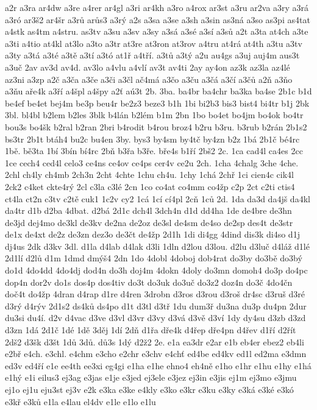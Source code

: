 {a2r
a3ra
ar4dw
a3re
a4rer
ar4gl
a3ri
ar4kh
a3ro
a4rox
ar3st
a3ru
ar2va
a3ry
a3rá
a3ró
ar3š2
ar4šr
a3rů
arůs3
a3rý
a2s
a3sa
a3se
a3sh
a3sin
as3ná
a3so
as3pi
as4tat
a4stk
as4tm
a4stru.
as3tv
a3su
a3sv
a3sy
a3sá
a3sé
a3sí
a3sů
a2t
a3ta
at4ch
a3te
a3ti
a4tio
at4kl
at3lo
a3to
a3tr
at3re
at3ron
at3rov
a4tru
at4rá
at4th
a3tu
a3tv
a3ty
a3tá
a3té
a3tě
a3tí
a3tó
at1ř
a4tří.
a3tů
a3tý
a2u
au4gs
a3uj
auj4m
aus3t
a3uč
2av
av3d
av4d.
av3lo
a4vlu
a4vlí
av3t
av4ti
2ay
ay4on
az3k
az3la
az4lé
az3ni
a3zp
a2č
a3ča
a3če
a3či
a3čl
ač4má
a3čo
a3ču
a3čá
a3čí
a3čů
a2ň
a3ňo
a3ňu
aře4k
a3ří
a4špl
a4špy
a2ť
aú3t
2b.
3ba.
ba4br
ba4chr
ba3ka
ba4se
2b1c
b1d
be4ef
be4et
bej4m
be3p
beu4r
be2z3
beze3
b1h
1bi
bi2b3
bis3
bist4
bi4tr
b1j
2bk
3bl.
bl4bl
b2lem
b2les
3blk
b4lán
b2lém
b1m
2bn
1bo
bo4et
bo4jm
bo4ok
bo4tr
bou3s
bo4šk
b2ral
b2ran
2bri
b4rodit
b4rou
broz4
b2ru
b3ru.
b3rub
b2rán
2b1s2
bs3tr
2b1t
btáh4
bu2c
bu4en
3by.
bys3
by4sm
by4tč
by4zn
b2z
1bá
2b1č
bé4rc
1bě.
bě3ta
1bí
3bín
bí4rc
2bň
b3řa
b3ře.
bře4s
b1ří
2bš2
2c.
1ca
cad4l
ca4es
2cc
1ce
cech4
ced4l
celo3
ce4ns
ce4ov
ce4ps
cer4v
ce2u
2ch.
1cha
4chalg
3che
4che.
2chl
ch4ly
ch4mb
2ch3n
2cht
4chte
1chu
ch4u.
1chy
1chá
2chř
1ci
cien4c
cik4l
2ck2
c4ket
ckte4rý
2cl
c3la
c3lé
2cn
1co
co4at
co4mm
co4žp
c2p
2ct
c2ti
ctis4
ct4la
ct2n
c3tv
c2tě
cuk1
1c2v
cy2
1cá
1cí
cí4pl
2cň
1ců
2d.
1da
da3d
da4jš
da4kl
da4tr
d1b
d2ba
4dbat.
d2bá
2d1c
dch4l
3dch4n
d1d
dd4ha
1de
de4bre
de3hn
de3jd
dej4mo
de3kl
de3kv
de2na
de2oz
de3sl
de4sm
de4so
de2sp
des4t
de3str
de1x
de4xt
de2z
de3zn
dez3o
de3čt
de4žp
2d1h
1di
di4gg
4dind
dis3k
di4so
d1j
dj4us
2dk
d3kv
3dl.
d1la
d4lab
d4lak
d3li
1dln
d2lou
d3lou.
d2lu
d3luč
d4láž
d1lé
2d1lí
d2lů
d1m
1dmd
dmýš4
2dn
1do
4dobl
4doboj
dob4rat
do3by
do3bě
do3bý
do1d
4do4dd
4do4dj
dod4n
do3h
doj4m
4dokn
4doly
do3mn
domoh4
do3p
do4pc
dop4n
dor2v
do1s
dos4p
dos4tiv
do3t
do3uk
do3uč
do3z2
doz4n
do3č
4do4čn
doč4t
do4žp
4dran
d4rap
d1re
d4ren
3drobn
d3ros
d3rou
d3roš
dr4sc
d3ruš
d3ré
d3rý
d4rýv
2d1s2
ds4ků
ds4po
d1t
d3tl
d3tř
1du
dum3ř
du3na
du3p
du4pn
2dur
du3si
du4í.
d2v
d4vac
d3ve
d3vl
d3vr
d3vy
d3vá
d3vě
d3ví
1dy
dy4su
d3zb
d3zd
d3zn
1dá
2d1č
1dé
1dě
3děj
1dí
2dň
d1řa
dře4k
d4řep
dře4pn
d4řev
d1ří
d2řít
2dš2
d3šk
d3št
1dů
3dů.
dů3s
1dý
d2ž2
2e.
e1a
ea3dr
e2ar
e1b
eb4er
ebez2
eb4li
e2bř
e4ch.
e3chl.
e4chm
e3cho
e2chr
e3chv
e4chť
ed4be
ed4kv
ed1l
ed2ma
e3dmn
ed3v
ed4ří
e1e
ee4th
ee3xi
eg4gi
e1ha
e1he
ehno4
eh4ně
e1ho
e1hr
e1hu
e1hy
e1há
e1hý
e1i
eilus3
ej3ag
e3jas
e1je
e3jed
ej3ele
e3jez
ej3in
e3jis
ej1m
ej3mo
e3jmu
ej1o
ej1u
eju3st
ej3v
e2k
e3ka
e3ke
e4kly
e3ko
e3kr
e3ku
e3ky
e3ká
e3ké
e3kó
e3kř
e3ků
e1la
e4lau
el4dv
e1le
e1lo
e1lu
}

